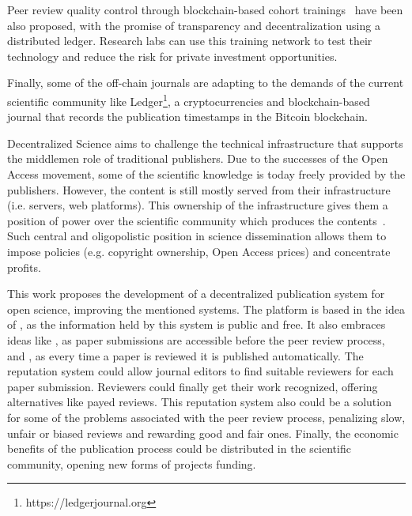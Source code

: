 Peer review quality control through blockchain-based cohort
trainings~\cite{dhillon2016bench} have been also proposed, with the promise of
transparency and decentralization using a distributed ledger. Research labs can
use this training network to test their technology and reduce the risk for
private investment opportunities.

Finally, some of the off-chain journals are adapting to the demands of the
current scientific community like Ledger\footnote{https://ledgerjournal.org}, a
cryptocurrencies and blockchain-based journal that records the publication
timestamps in the Bitcoin blockchain.

Decentralized Science aims to challenge the technical infrastructure that
supports the middlemen role of traditional publishers. Due to the successes of
the Open Access movement, some of the scientific knowledge is today freely
provided by the publishers. However, the content is still mostly served from
their infrastructure (i.e. servers, web platforms). This ownership of the
infrastructure gives them a position of power over the scientific community
which produces the contents~\cite{fuster2010governance}. Such central and
oligopolistic position in science dissemination allows them to impose policies
(e.g. copyright ownership, Open Access prices) and concentrate profits.

This work proposes the development of a decentralized publication system for
open science, improving the mentioned systems. The platform is based in the idea
of , as the information held by this system is public and free.
It also embraces ideas like , as paper submissions are accessible
before the peer review process, and , as every time a
paper is reviewed it is published automatically. The reputation system could
allow journal editors to find suitable reviewers for each paper submission.
Reviewers could finally get their work recognized, offering alternatives like
payed reviews. This reputation system also could be a solution for some of the
problems associated with the peer review process, penalizing slow, unfair or
biased reviews and rewarding good and fair ones. Finally, the economic benefits
of the publication process could be distributed in the scientific community,
opening new forms of projects funding.


